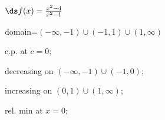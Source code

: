 {$\ds f(x) =\frac{x^2-4}{x^2-1}$
}
{domain=$(-\infty,-1)\cup(-1,1)\cup(1,\infty)$

c.p. at $c=0$; 

decreasing on $(-\infty,-1)\cup (-1,0)$;

increasing on $(0,1)\cup (1,\infty)$;

rel. min at $x=0$;
}
